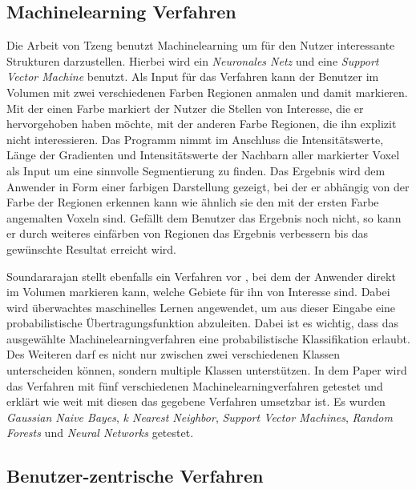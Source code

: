 \subsection{Machinelearning Verfahren}

Die Arbeit von Tzeng \cite{tzeng2005intelligent} benutzt Machinelearning um für den Nutzer interessante Strukturen darzustellen. Hierbei wird ein \textit{Neuronales Netz} und eine \textit{Support Vector Machine} benutzt.
\newline
Als Input für das Verfahren kann der Benutzer im Volumen mit zwei verschiedenen Farben Regionen anmalen und damit markieren. Mit der einen Farbe markiert der Nutzer die Stellen von Interesse, die er hervorgehoben haben möchte, mit der anderen Farbe Regionen, die ihn explizit nicht interessieren. Das Programm nimmt im Anschluss die Intensitätswerte, Länge der Gradienten und Intensitätswerte der Nachbarn aller markierter Voxel als Input um eine sinnvolle Segmentierung zu finden.
\newline
Das Ergebnis wird dem Anwender in Form einer farbigen Darstellung gezeigt, bei der er abhängig von der Farbe der Regionen erkennen kann wie ähnlich sie den mit der ersten Farbe angemalten Voxeln sind. Gefällt dem Benutzer das Ergebnis noch nicht, so kann er durch weiteres einfärben von Regionen das Ergebnis verbessern bis das gewünschte Resultat erreicht wird.


Soundararajan stellt ebenfalls ein Verfahren vor \cite{soundararajan2015learning}, bei dem der Anwender direkt im Volumen markieren kann, welche Gebiete für ihn von Interesse sind.
\newline
Dabei wird überwachtes maschinelles Lernen angewendet, um aus dieser Eingabe eine probabilistische Übertragungsfunktion abzuleiten. Dabei ist es wichtig, dass das ausgewählte Machinelearningverfahren eine probabilistische Klassifikation erlaubt. Des Weiteren darf es nicht nur zwischen zwei verschiedenen Klassen unterscheiden können, sondern multiple Klassen unterstützen.
\newline
In dem Paper wird das Verfahren mit fünf verschiedenen Machinelearningverfahren getestet und erklärt wie weit mit diesen das gegebene Verfahren umsetzbar ist. Es wurden \textit{Gaussian Naive Bayes}, \textit{k Nearest Neighbor}, \textit{Support Vector Machines}, \textit{Random Forests} und \textit{Neural Networks} getestet.



\subsection{Benutzer-zentrische Verfahren}

